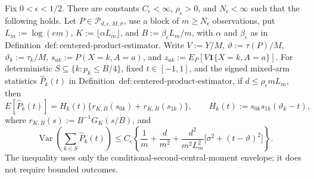 Fix \(0<\epsilon<1/2\).  There are constants \(C_{\epsilon}<\infty\), \(\rho_{\epsilon}>0\), and \(N_{\epsilon}<\infty\) such that the following holds.  Let \(P\in\mathcal P_{d,\epsilon,M,\sigma}\), use a block of \(m\ge N_{\epsilon}\) observations, put \(L_m:=\log(em)\), \(K:=\lfloor\alpha L_m\rfloor\), and \(B:=\beta_{\epsilon}L_m/m\), with \(\alpha\) and \(\beta_{\epsilon}\) as in Definition~\(\mathrm{def:centered\text{-}product\text{-}estimator}\).  Write \(V:=Y/M\), \(\vartheta:=\tau(P)/M\), \(\vartheta_k:=\tau_k/M\), \(s_{ak}:=P(X=k,A=a)\), and \(z_{ak}:=E_P[V\mathbf 1\{X=k,A=a\}]\).  For deterministic \(S\subseteq\{k:p_k\le B/4\}\), fixed \(t\in[-1,1]\), and the signed mixed-arm statistics \(\widehat P_k(t)\) in Definition~\(\mathrm{def:centered\text{-}product\text{-}estimator}\), if \(d\le\rho_{\epsilon}mL_m\), then
\[
 E[\widehat P_k(t)]
 =H_k(t)\{r_{K,B}(s_{0k})+r_{K,B}(s_{1k})\},
 \qquad
 H_k(t):=s_{0k}s_{1k}(\vartheta_k-t),
\]
where \(r_{K,B}(s):=B^{-1}G_K(s/B)\), and
\[
 \operatorname{Var}\!\left(\sum_{k\in S}\widehat P_k(t)\right)
 \le C_{\epsilon}\left\{
 \frac1m+\frac d{m^2}
 +\frac{d^2}{m^2L_m^2}
 \bigl[\sigma^2+(t-\vartheta)^2\bigr]
 \right\}.
\]
The inequality uses only the conditional-second-central-moment envelope; it does not require bounded outcomes.